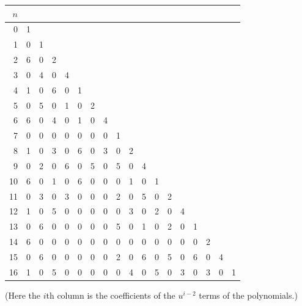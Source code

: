 \documentclass[12pt, letterpaper]{article} %
\begin{document}
 \begin{center}
  \begin{tabular}{|r|l|l|l|l|l|l|l|l|l|l|l|l|l|l|l|l|l|}
   \hline
   $n$ &  &   &   &   &   &   &   &   &   &   &   &   &   &   &   &   &   \\ \hline
   0   & 1 &   &   &   &   &   &   &   &   &   &   &   &   &   &   &   &   \\ \hline
   1   & 0 & 1 &   &   &   &   &   &   &   &   &   &   &   &   &   &   &   \\ \hline
   2   & 6 & 0 & 2 &   &   &   &   &   &   &   &   &   &   &   &   &   &   \\ \hline
   3   & 0 & 4 & 0 & 4 &   &   &   &   &   &   &   &   &   &   &   &   &   \\ \hline
   4   & 1 & 0 & 6 & 0 & 1 &   &   &   &   &   &   &   &   &   &   &   &   \\ \hline
   5   & 0 & 5 & 0 & 1 & 0 & 2 &   &   &   &   &   &   &   &   &   &   &   \\ \hline
   6   & 6 & 0 & 4 & 0 & 1 & 0 & 4 &   &   &   &   &   &   &   &   &   &   \\ \hline
   7   & 0 & 0 & 0 & 0 & 0 & 0 & 0 & 1 &   &   &   &   &   &   &   &   &   \\ \hline
   8   & 1 & 0 & 3 & 0 & 6 & 0 & 3 & 0 & 2 &   &   &   &   &   &   &   &   \\ \hline
   9   & 0 & 2 & 0 & 6 & 0 & 5 & 0 & 5 & 0 & 4 &   &   &   &   &   &   &   \\ \hline
   10  & 6 & 0 & 1 & 0 & 6 & 0 & 0 & 0 & 1 & 0 & 1 &   &   &   &   &   &   \\ \hline
   11  & 0 & 3 & 0 & 3 & 0 & 0 & 0 & 2 & 0 & 5 & 0 & 2 &   &   &   &   &   \\ \hline
   12  & 1 & 0 & 5 & 0 & 0 & 0 & 0 & 0 & 3 & 0 & 2 & 0 & 4 &   &   &   &   \\ \hline
   13  & 0 & 6 & 0 & 0 & 0 & 0 & 0 & 5 & 0 & 1 & 0 & 2 & 0 & 1 &   &   &   \\ \hline
   14  & 6 & 0 & 0 & 0 & 0 & 0 & 0 & 0 & 0 & 0 & 0 & 0 & 0 & 0 & 2 &   &   \\ \hline
   15  & 0 & 6 & 0 & 0 & 0 & 0 & 0 & 2 & 0 & 6 & 0 & 5 & 0 & 6 & 0 & 4 &   \\ \hline
   16  & 1 & 0 & 5 & 0 & 0 & 0 & 0 & 0 & 4 & 0 & 5 & 0 & 3 & 0 & 3 & 0 & 1 \\ \hline
  \end{tabular}
  \end{center}
\begin{center}(Here the $i$th column is the coefficients of the $u^{i-2}$ terms of the polynomials.)\end{center} \\
\end{document}
